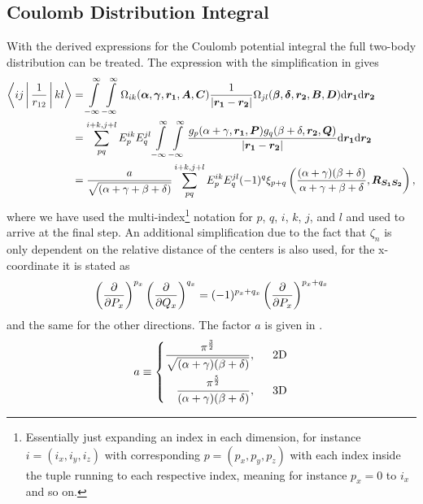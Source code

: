 \subsection{Coulomb Distribution Integral}
    With the derived expressions for the Coulomb potential integral the full
    two-body distribution can be treated. The expression with the
    simplification in  gives
        \begin{align}
            \Braket{ij|\frac{1}{r_{12}}|kl} &= \infint\infint
            \Omega_{ik}(\blds{\alpha},\blds{\gamma},\blds{r_1},
            \blds{A},\blds{C}) \frac{1}{\abs{\blds{r_1} - \blds{r_2}}}
            \Omega_{jl}(\blds{\beta},\blds{\delta},\blds{r_2},
            \blds{B},\blds{D}) \md\blds{r_1} \md\blds{r_2} \nonumber \\
            &= \suml{pq}{i+k,j+l} E^{ik}_pE^{jl}_q \infint\infint
            \frac{g_{p}(\alpha+\gamma,\blds{r_1},\blds{P})
            g_{q}(\beta+\delta,\blds{r_2},\blds{Q})}{\abs{\blds{r_1} -
            \blds{r_2}}} \md\blds{r_1} \md\blds{r_2}\nonumber \\
            &= \frac{a}{\sqrt{(\alpha+\gamma+\beta+\delta)}} \suml{pq}{i+k,j+l}
            E^{ik}_pE^{jl}_q (-1)^{q} \xi_{p+q}\left(\frac{(\alpha +
            \gamma)(\beta + \delta)}{\alpha + \gamma + \beta +
            \delta},\blds{R_{S_1S_2}}\right),
            \label{eq:coulomb_dist_integral_stype}
        \end{align}
    where we have used the multi-index\footnote{Essentially just expanding an
    index in each dimension, for instance $i=(i_x,i_y,i_z)$ with corresponding
    $p=(p_x, p_y, p_z)$ with each index inside the tuple running to each
    respective index, meaning for instance $p_x=0$ to $i_x$ and so on.}
    notation for $p$, $q$, $i$, $k$, $j$, and $l$ 
    and used  to arrive at the final
    step. An additional simplification due to the fact that $\zeta_n$ is only
    dependent on the relative distance of the centers is also used, for the
    x-coordinate it is stated as
        \begin{equation}
            \left(\frac{\mathrm{\partial}}{\mathrm{\partial} P_x}\right)^{p_x}\left(\frac{\mathrm{\partial}}{\mathrm{\partial} Q_x}\right)^{q_x} = (-1)^{p_x+q_x} \left(\frac{\mathrm{\partial}}{\mathrm{\partial} P_x}\right)^{p_x+q_x}
        \end{equation}
    and the same for the other directions. The factor $a$ is given in
    .
        \begin{equation}
            a \equiv \left\{\begin{aligned}
                \frac{\pi^{\frac{3}{2}}}
                {\sqrt{(\alpha+\gamma)(\beta+\delta)}},\indent \text{2D} \\
                \frac{\pi^{\frac{5}{2}}}
                {(\alpha+\gamma)(\beta+\delta)},\indent \text{3D} \\
            \end{aligned}\right.
            \label{eq:defaaaaa}
        \end{equation}

